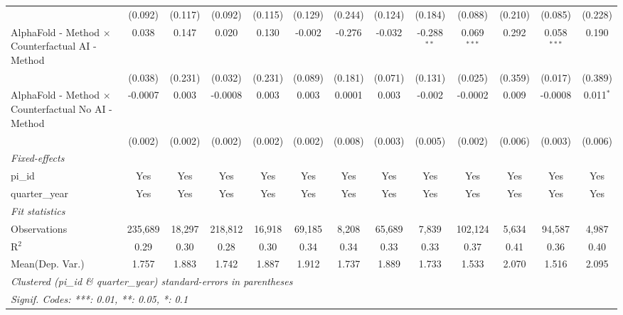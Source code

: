 \begin{tabular}{lcccccccccccc}
                                                              & (0.092) & (0.117)       & (0.092)      & (0.115)      & (0.129) & (0.244) & (0.124)      & (0.184)       & (0.088)       & (0.210)       & (0.085)       & (0.228)\\   
   AlphaFold - Method $\times$ Counterfactual AI - Method     & 0.038   & 0.147         & 0.020        & 0.130        & -0.002  & -0.276  & -0.032       & -0.288$^{**}$ & 0.069$^{***}$ & 0.292         & 0.058$^{***}$ & 0.190\\   
                                                              & (0.038) & (0.231)       & (0.032)      & (0.231)      & (0.089) & (0.181) & (0.071)      & (0.131)       & (0.025)       & (0.359)       & (0.017)       & (0.389)\\   
   AlphaFold - Method $\times$ Counterfactual No AI - Method  & -0.0007 & 0.003         & -0.0008      & 0.003        & 0.003   & 0.0001  & 0.003        & -0.002        & -0.0002       & 0.009         & -0.0008       & 0.011$^{*}$\\   
                                                              & (0.002) & (0.002)       & (0.002)      & (0.002)      & (0.002) & (0.008) & (0.003)      & (0.005)       & (0.002)       & (0.006)       & (0.003)       & (0.006)\\   
   \midrule
   \emph{Fixed-effects}\\
   pi\_id                                                     & Yes     & Yes           & Yes          & Yes          & Yes     & Yes     & Yes          & Yes           & Yes           & Yes           & Yes           & Yes\\  
   quarter\_year                                              & Yes     & Yes           & Yes          & Yes          & Yes     & Yes     & Yes          & Yes           & Yes           & Yes           & Yes           & Yes\\  
   \midrule
   \emph{Fit statistics}\\
   Observations                                               & 235,689 & 18,297        & 218,812      & 16,918       & 69,185  & 8,208   & 65,689       & 7,839         & 102,124       & 5,634         & 94,587        & 4,987\\  
   R$^2$                                                      & 0.29    & 0.30          & 0.28         & 0.30         & 0.34    & 0.34    & 0.33         & 0.33          & 0.37          & 0.41          & 0.36          & 0.40\\  
Mean(Dep. Var.) & 1.757 & 1.883 & 1.742 & 1.887 & 1.912 & 1.737 & 1.889 & 1.733 & 1.533 & 2.070 & 1.516 & 2.095 \\
   \midrule \midrule
   \multicolumn{13}{l}{\emph{Clustered (pi\_id \& quarter\_year) standard-errors in parentheses}}\\
   \multicolumn{13}{l}{\emph{Signif. Codes: ***: 0.01, **: 0.05, *: 0.1}}\\
\end{tabular}
\par\endgroup
